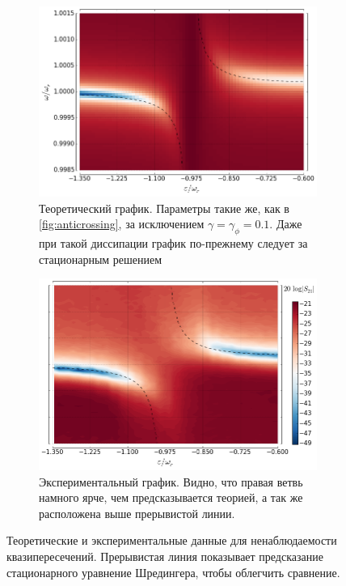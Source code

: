 \documentclass[12pt, twoside]{report}
\numberwithin{equation}{section}
\numberwithin{figure}{section}
\begin{document}
\begin{figure}[h!]
\begingroup
\captionsetup{justification=normal}
\captionsetup[subfigure]{justification=normal, width=0.9\textwidth}

\centering
\begin{subfigure}[t]{0.49\textwidth}
\centering
\includegraphics[width=\textwidth]{Pictures/anticrossing_vanishing}
\caption{Теоретический график. Параметры такие же, как в \autoref{fig:anticrossing}, за исключением $\gamma = \gamma_\phi = 0.1$. Даже при такой диссипации график по-прежнему следует за стационарным решением}
\end{subfigure}
%
\begin{subfigure}[t]{0.49\textwidth}
\centering
\includegraphics[width=\textwidth]{Pictures/anticrossing_vanishing_exp}
\caption{Экспериментальный график. Видно, что правая ветвь намного ярче, чем предсказывается теорией, а так же расположена выше прерывистой линии.}
\end{subfigure}
\caption{Теоретические и экспериментальные данные для ненаблюдаемости квазипересечений. Прерывистая линия показывает предсказание стационарного уравнение Шредингера, чтобы облегчить сравнение.}
\label{fig:anticrossing_vanishing}
\endgroup
\end{figure}
\end{document}
